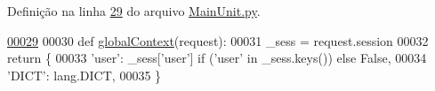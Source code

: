 Definição na linha \hyperlink{MainUnit_8py_source_l00029}{29} do arquivo \hyperlink{MainUnit_8py_source}{Main\-Unit.\-py}.


\begin{DoxyCode}
\hypertarget{namespaceELO_1_1MainUnit_l00029}{}\hyperlink{namespaceELO_1_1MainUnit_a021ebb0ec94aea9dca4014a7218ec38d}{00029} 
00030 \textcolor{keyword}{def }\hyperlink{namespaceELO_1_1MainUnit_a021ebb0ec94aea9dca4014a7218ec38d}{globalContext}(request):
00031     \_sess = request.session
00032     \textcolor{keywordflow}{return} \{
00033             \textcolor{stringliteral}{'user'}: \_sess[\textcolor{stringliteral}{'user'}] \textcolor{keywordflow}{if} (\textcolor{stringliteral}{'user'} \textcolor{keywordflow}{in} \_sess.keys()) \textcolor{keywordflow}{else} \textcolor{keyword}{False},
00034             \textcolor{stringliteral}{'DICT'}: lang.DICT,
00035         \}

\end{DoxyCode}

